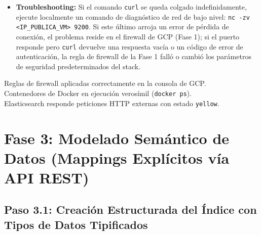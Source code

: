 \documentclass[
  coursetitle={Cómputo Nube y Tecnologías Emergentes},
  coursehours={96},
  coursedate={Verano 2026},
  doctype={Guía de Laboratorio Práctico},
  otherlangs={english,french},
  authorname={Lázaro},
  authorsurname={Bustio-Martínez},
  authortitle={PhD},
  role={Profesor Investigador},
  email={lbustio@inaoe.mx},
  phone={5559504000},
  ext={7459},
  institution={Instituto Nacional de Astrofísica, Óptica y Electrónica (INAOE)},
  department={Maestría en Ciencias en Tecnologías de Seguridad},
  address={Luis Enrique Erro 1, Sta. Ma. Tonantzintla, San Andrés Cholula, CP 72840, Puebla, México},
  margin={0.5in}
]{../../lbustio_lecture_notes}
\begin{document}
\begin{itemize}
    \item \textbf{Troubleshooting:} Si el comando \texttt{curl} se queda colgado indefinidamente, ejecute localmente un comando de diagnóstico de red de bajo nivel: \texttt{nc -zv <IP\_PUBLICA\_VM> 9200}. Si este último arroja un error de pérdida de conexión, el problema reside en el firewall de GCP (Fase 1); si el puerto responde pero \texttt{curl} devuelve una respuesta vacía o un código de error de autenticación, la regla de firewall de la Fase 1 falló o cambió los parámetros de seguridad predeterminados del stack.
\end{itemize}

\begin{tcolorbox}[colback=green!5!white,colframe=green!60!black,title=\textbf{Checkpoint de Vlidación 1}]
\checkmark Reglas de firewall aplicadas correctamente en la consola de GCP.\\
\checkmark Contenedores de Docker en ejecución verosímil (\texttt{docker ps}).\\
\checkmark Elasticsearch responde peticiones HTTP externas con estado \texttt{yellow}.
\end{tcolorbox}

\section{Fase 3: Modelado Semántico de Datos (Mappings Explícitos vía API REST)}

\subsection{Paso 3.1: Creación Estructurada del Índice con Tipos de Datos Tipificados}
\end{document}
